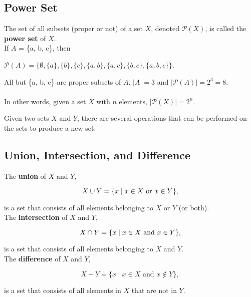 \clearpage

\subsection*{Power Set}

The set of all subsets (proper or not) of a set $X$, denoted $\mathcal{P}(X)$, is called the \textbf{power set} of 
$X$.\\

If $A$ = \{a, b, c\}, then

\begin{center}
$\mathcal{P}(A) = \{\emptyset, \{a\}, \{b\}, \{c\}, \{a, b\}, \{a, c\}, \{b, c\}, \{a, b, c\}\}$.
\end{center}

All but \{a, b, c\} are proper subsets of $A$. $|A| = 3$ and $|\mathcal{P}(A)| = 2^3 = 8$.\\\\
In other words, given a set $X$ with $n$ elements, $|\mathcal{P}(X)| = 2^n$. 
\clearpage

Given two sets $X$ and $Y$, there are several operations that can be performed on the sets to produce a new set.\\

\subsection*{Union, Intersection, and Difference}

The \textbf{union} of $X$ and $Y$,

\[
    X \cup Y = \{x \mid x \in X \text{ or } x \in Y\},
\]

is a set that consists of all elements belonging to $X$ or $Y$ (or both).\\

The \textbf{intersection} of $X$ and $Y$,

\[
    X \cap Y = \{x \mid x \in X \text{ and } x \in Y\},
\]

is a set that consists of all elements belonging to $X$ and $Y$.\\

The \textbf{difference} of $X$ and $Y$,

\[
    X - Y = \{x \mid x \in X \text{ and } x \not\in Y\},
\]

is a set that consists of all elements in $X$ that are not in $Y$.\\

